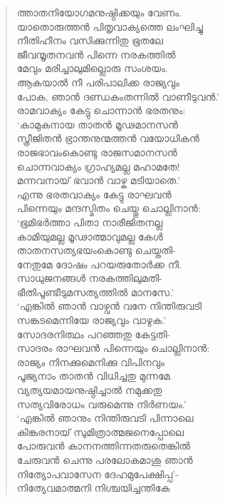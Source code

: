\begin{verse}
ത്താതനിയോഗമനുഷ്ഠിക്കയും വേണം.\\
യാതൊരുത്തന്‍ പിതൃവാക്യത്തെ ലംഘിച്ചു\\
നീതിഹീനം വസിക്കുന്നിതു ഭൂതലേ\\
ജീവന്മൃതനവന്‍ പിന്നെ നരകത്തില്‍\\
മേവും മരിച്ചാലുമില്ലൊരു സംശയം.\\
ആകയാല്‍ നീ പരിപാലിക്ക രാജ്യവും\\
പോക, ഞാന്‍ ദണ്ഡകംതന്നില്‍ വാണീടുവന്‍.’\\
രാമവാക്യം കേട്ടു ചൊന്നാന്‍ ഭരതനും:\\
‘കാമുകനായ താതന്‍ മൂഢമാനസന്‍\\
സ്ത്രീജിതന്‍ ഭ്രാന്തനുന്മത്തന്‍ വയോധികന്‍\\
രാജഭാവംകൊണ്ടു രാജസമാനസന്‍\\
ചൊന്നവാക്യം ഗ്രാഹ്യമല്ല മഹാമതേ!\\
മന്നവനായ് ഭവാന്‍ വാഴ്ക മടിയാതെ.’\\
എന്നു ഭരതവാക്യം കേട്ടു രാഘവന്‍\\
പിന്നെയും മന്ദസ്മിതം ചെയ്തു ചൊല്ലിനാന്‍:\\
‘ഭൂമിഭര്‍ത്താ പിതാ നാരീജിതനല്ല\\
കാമിയുമല്ല മൂഢാത്മാവുമല്ല കേള്‍\\
താതനസത്യഭയംകൊണ്ടു ചെയ്തതി-\\
നേതുമേ ദോഷം പറയരുതോര്‍ക്ക നീ.\\
സാധുജനങ്ങള്‍ നരകത്തിലുമതി-\\
ഭീതിപൂണ്ടീടുമസത്യത്തില്‍ മാനസേ.’\\
‘എങ്കില്‍ ഞാന്‍ വാഴ്വന്‍ വനേ നിന്തിരുവടി\\
സങ്കടമെന്നിയേ രാജ്യവും വാഴുക.’\\
സോദരനിത്ഥം പറഞ്ഞതു കേട്ടതി-\\
സാദരം രാഘവന്‍ പിന്നെയും ചൊല്ലിനാന്‍:\\
രാജ്യം നിനക്കുമെനിക്കു വിപിനവും\\
പൂജ്യനാം താതന്‍ വിധിച്ചതു മുന്നമേ.\\
വ്യത്യയമായനുഷ്ഠിച്ചാല്‍ നമുക്കതു\\
സത്യവിരോധം വരുമെന്നു നിര്‍ണയം.’\\
‘എങ്കില്‍ ഞാനും നിന്തിരുവടി പിന്നാലെ\\
കിങ്കരനായ് സുമിത്രാത്മജനെപ്പോലെ\\
പോരുവന്‍ കാനനത്തിന്നതരുതെങ്കില്‍\\
ചേരുവന്‍ ചെന്നു പരലോകമാശു ഞാന്‍\\
നിത്യോപവാസേന ദേഹമുപേക്ഷിപ്പ’-\\
നിത്യേവമാത്മനി നിശ്ചയിച്ചന്തികേ\\

\end{verse}
